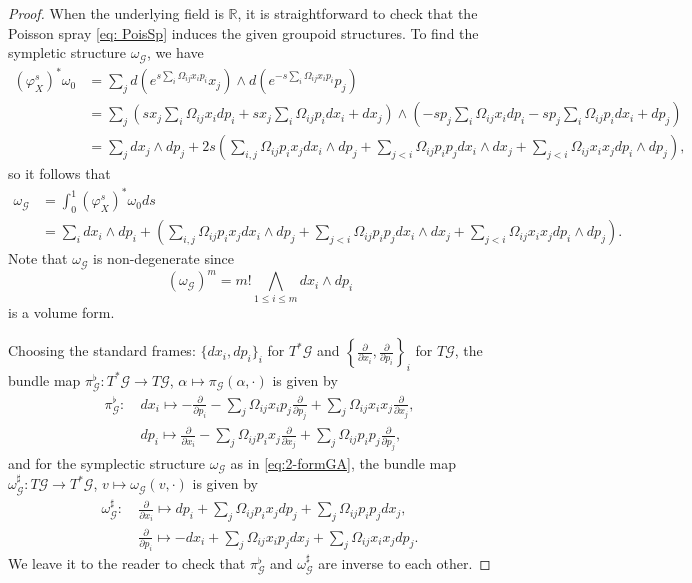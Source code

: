 \documentclass{amsart}
\numberwithin{equation}{section}
\newcommand{\cG}{\mathcal{G}}
\newcommand{\RR}{\mathbb{R}}
\begin{document}
\begin{proof}
  When the underlying field is $\RR$, it is straightforward to check that the Poisson spray \eqref{eq: PoisSp} induces the given groupoid structures. To find the sympletic structure $\omega_\cG$, we have
  \begin{align*}
    \left(\varphi_X^s\right)^*\omega_0 & = \sum_{j} d \left(e^{ s \sum_{i} \Omega_{ij} x_ip_i}x_j \right) \wedge d \left(e^{- s \sum_{i} \Omega_{ij} x_ip_i}p_j \right) \\
    & = \sum_{j} \left(s x_j \sum_{i} \Omega_{ij} x_i dp_i + s x_j \sum_{i} \Omega_{ij} p_i dx_i + d x_j \right) \wedge \left(- s p_j \sum_{i} \Omega_{ij} x_i dp_i - s p_j \sum_{i} \Omega_{ij} p_i dx_i + d p_j \right) \\
    & = \sum_{j} dx_j \wedge dp_j + 2s \left( \sum_{i, j} \Omega_{ij}p_i x_j d x_i \wedge d p_j  + \sum_{j < i} \Omega_{ij}p_ip_j d x_i \wedge d x_j + \sum_{j < i} \Omega_{ij}x_ix_j d p_i \wedge d p_j \right),
  \end{align*}
  so it follows that
  \begin{align*}
    \omega_\cG & = \int_{0}^{1} (\varphi_X^s)^*\omega_0 ds \\
    & = \sum_{i} dx_i \wedge dp_i
      + \left(
	\sum_{i, j} \Omega_{ij}p_ix_j dx_i \wedge dp_j 
	+ \sum_{j < i} \Omega_{ij}p_ip_j dx_i \wedge dx_j
	+ \sum_{j < i} \Omega_{ij}x_ix_j dp_i \wedge dp_j
      \right).
  \end{align*}
  Note that $\omega_\cG$ is non-degenerate since
  \[(\omega_\cG)^m = m! \bigwedge\limits_{1\leq i\leq m} dx_i \wedge dp_i\]
  is a volume form.

  Choosing the standard frames: $\{dx_i, dp_i\}_i$ for $T^*\cG$ and $\left\{\frac{\partial}{\partial x_i}, \frac{\partial}{\partial p_i}\right\}_i$ for $T\cG$, the bundle map $\pi_\cG^\flat: T^*\cG \to T\cG$, $\alpha \mapsto \pi_\cG(\alpha, \cdot)$ is given by
  \begin{align*}
    \pi_\cG^\flat: &~ dx_i \mapsto -\frac{\partial}{\partial p_i} - \sum_{j} \Omega_{ij} x_i p_j \frac{\partial}{\partial p_j}+ \sum_{j} \Omega_{ij} x_i x_j \frac{\partial}{\partial x_j}, \\
    &~ dp_i \mapsto \frac{\partial}{\partial x_i} - \sum_{j} \Omega_{ij} p_i x_j \frac{\partial}{\partial x_j}+ \sum_{j} \Omega_{ij} p_i p_j \frac{\partial}{\partial p_j},
  \end{align*}
  and for the symplectic structure $\omega_\cG$ as in \eqref{eq:2-formGA}, the bundle map $\omega_\cG^\sharp: T\cG \to T^*\cG$, $v \mapsto \omega_\cG(v, \cdot)$ is given by
  \begin{align*}
    \omega_\cG^\sharp: &~ \frac{\partial}{\partial x_i} \mapsto dp_i + \sum_{j} \Omega_{ij} p_i x_j dp_j + \sum_{j} \Omega_{ij} p_i p_j dx_j, \\
    &~ \frac{\partial}{\partial p_i} \mapsto -dx_i + \sum_{j} \Omega_{ij} x_i p_j dx_j + \sum_{j} \Omega_{ij} x_i x_j dp_j.
  \end{align*}
  We leave it to the reader to check that $\pi_\cG^\flat$ and $\omega_\cG^\sharp$ are inverse to each other.


\end{proof}
\end{document}
